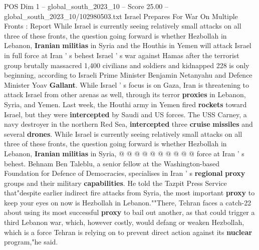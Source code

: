 \begin{textsample}{POS Dim 1 – global\_south\_2023\_10 – Score 25.00 – global\_south\_2023\_10/102980503.txt}  \label{ex:f1_pos_051}
Israel Prepares For War On Multiple Fronts : Report While Israel is currently seeing relatively small attacks on all three of these fronts, the question going forward is whether Hezbollah in Lebanon, \textbf{Iranian} \textbf{militias} in Syria and the Houthis in Yemen will attack Israel in full force at Iran ' s behest Israel ' s war against Hamas after the terrorist group brutally massacred 1,400 civilians and soldiers and kidnapped 228 is only beginning, according to Israeli Prime Minister Benjamin Netanyahu and Defence Minister Yoav \textbf{Gallant}.
While Israel ' s focus is on Gaza, Iran is threatening to attack Israel from other arenas as well, through its terror \textbf{proxies} in Lebanon, Syria, and Yemen.
Last week, the Houthi army in Yemen fired \textbf{rockets} toward Israel, but they were \textbf{intercepted} by Saudi and US forces.
The USS Carney, a navy destroyer in the northern Red Sea, \textbf{intercepted} three \textbf{cruise} \textbf{missiles} and several \textbf{drones}.
While Israel is currently seeing relatively small attacks on all three of these fronts, the question going forward is whether Hezbollah in Lebanon, \textbf{Iranian} \textbf{militias} in Syria, @ @ @ @ @ @ @ @ @ @ force at Iran ' s behest.
Behnam Ben Taleblu, a senior fellow at the Washington-based Foundation for Defence of Democracies, specialises in Iran ' s \textbf{regional} \textbf{proxy} groups and their military \textbf{capabilities}.
He told the Tazpit Press Service that"despite earlier indirect fire attacks from Syria, the most important \textbf{proxy} to keep your eyes on now is Hezbollah in Lebanon.""There, Tehran faces a catch-22 about using its most successful \textbf{proxy} to bail out another, as that could trigger a third Lebanon war, which, however costly, would defang or weaken Hezbollah, which is a force Tehran is relying on to prevent direct action against its \textbf{nuclear} program,"he said.

\end{textsample}

